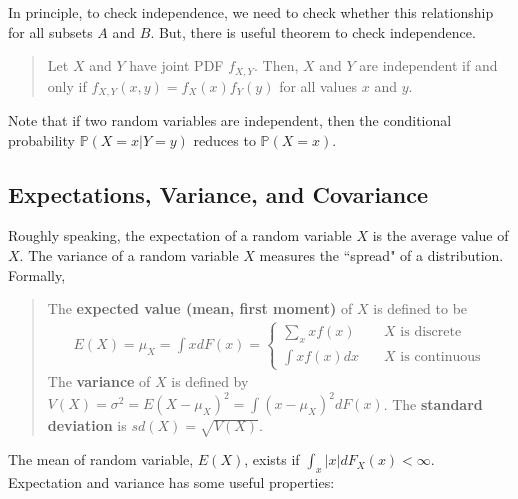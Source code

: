 \documentclass[
  12pt,
]{article}
\begin{document}
In principle, to check independence, we need to check whether this
relationship for all subsets \(A\) and \(B\). But, there is useful
theorem to check independence.

\begin{quote}
Let \(X\) and \(Y\) have joint PDF \(f_{X,Y}\). Then, \(X\) and \(Y\)
are independent if and only if \(f_{X,Y}(x,y) = f_X(x) f_Y(y)\) for all
values \(x\) and \(y\).
\end{quote}

Note that if two random variables are independent, then the conditional
probability \(\mathbb{P}(X = x | Y = y)\) reduces to
\(\mathbb{P}(X = x)\).

\hypertarget{expectations-variance-and-covariance}{%
\subsection{Expectations, Variance, and
Covariance}\label{expectations-variance-and-covariance}}

Roughly speaking, the expectation of a random variable \(X\) is the
average value of \(X\). The variance of a random variable \(X\) measures
the ``spread" of a distribution. Formally,

\begin{quote}
The \textbf{expected value (mean, first moment)} of \(X\) is defined to
be \begin{align*}
E(X) 
= \mu_X
= \int x dF(x) 
=
\begin{cases}
\sum_x x f(x)  &\quad\text{$X$ is discrete}  \\
\int x f(x) dx &\quad\text{$X$ is continuous} 
\end{cases}
\end{align*} The \textbf{variance} of \(X\) is defined by
\(V(X) = \sigma^2 = E(X - \mu_X)^2 = \int (x - \mu_X)^2 dF(x)\). The
\textbf{standard deviation} is \(sd(X) = \sqrt{V(X)}\).
\end{quote}

The mean of random variable, \(E(X)\), exists if
\(\int_x |x| dF_X(x) < \infty\). Expectation and variance has some
useful properties:
\end{document}
